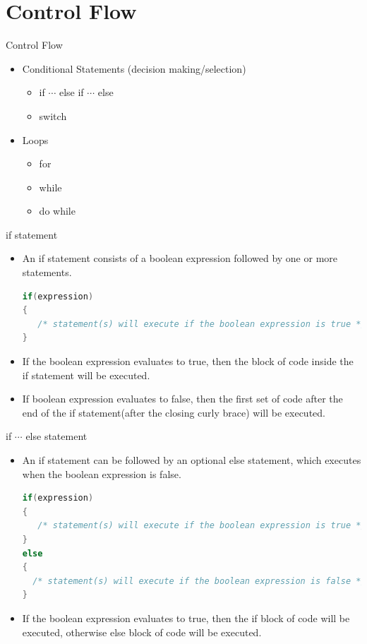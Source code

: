 \documentclass[10pt,t]{beamer}
\begin{document}
\section{Control Flow}
\begin{frame}{Control Flow}
  \begin{itemize}
    \item Conditional Statements (decision making/selection)
    \begin{itemize}
      \item if $\cdots$ else if $\cdots$ else
      \item switch
    \end{itemize}
    \item Loops
    \begin{itemize}
      \item for
      \item while
      \item do while
    \end{itemize}
  \end{itemize}
\end{frame}

\begin{frame}[fragile]{if statement}
  \begin{itemize}
    \item An if statement consists of a boolean expression followed by one or more statements.
      \begin{lstlisting}[language=C,basicstyle=\scriptsize\ttfamily]
if(expression)
{
   /* statement(s) will execute if the boolean expression is true */
}
      \end{lstlisting}
    \item If the boolean expression evaluates to true, then the block of code inside the if statement will be executed. 
    \item If boolean expression evaluates to false, then the first set of code after the end of the if statement(after the closing curly brace) will be executed.
  \end{itemize}
\end{frame}

\begin{frame}[fragile]{if $\cdots$ else statement}
  \begin{itemize}
    \item An if statement can be followed by an optional else statement, which executes when the boolean expression is false.
      \begin{lstlisting}[language=C,basicstyle=\scriptsize\ttfamily]
if(expression)
{
   /* statement(s) will execute if the boolean expression is true */
}
else
{
  /* statement(s) will execute if the boolean expression is false */
}
      \end{lstlisting}
    \item If the boolean expression evaluates to true, then the if block of code will be executed, otherwise else block of code will be executed.
  \end{itemize}
\end{frame}
\end{document}
